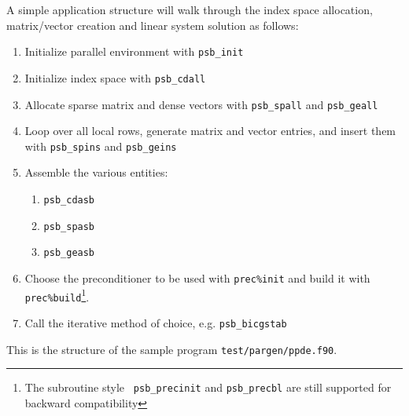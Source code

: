 A simple application structure will walk through the index space
allocation, matrix/vector creation and linear system solution as
follows:
\begin{enumerate}
\item Initialize parallel environment with \verb|psb_init|
\item Initialize index space with \verb|psb_cdall|
\item Allocate sparse matrix and dense vectors with \verb|psb_spall|
  and \verb|psb_geall|
\item Loop over all local rows, generate matrix and vector entries,
  and insert them with \verb|psb_spins| and \verb|psb_geins|
\item Assemble the various entities: 
\begin{enumerate}
\item \verb|psb_cdasb|
\item \verb|psb_spasb|
\item \verb|psb_geasb|
\end{enumerate}
\item Choose the preconditioner to be used with \verb|prec%init| and
  build it with \verb|prec%build|\footnote{The subroutine style {\tt
      psb\_precinit} and {\tt psb\_precbl} are still supported for
    backward compatibility}. 
\item Call the iterative method of choice, e.g. \verb|psb_bicgstab|
\end{enumerate}
This is the structure of the sample program
\verb|test/pargen/ppde.f90|. 

